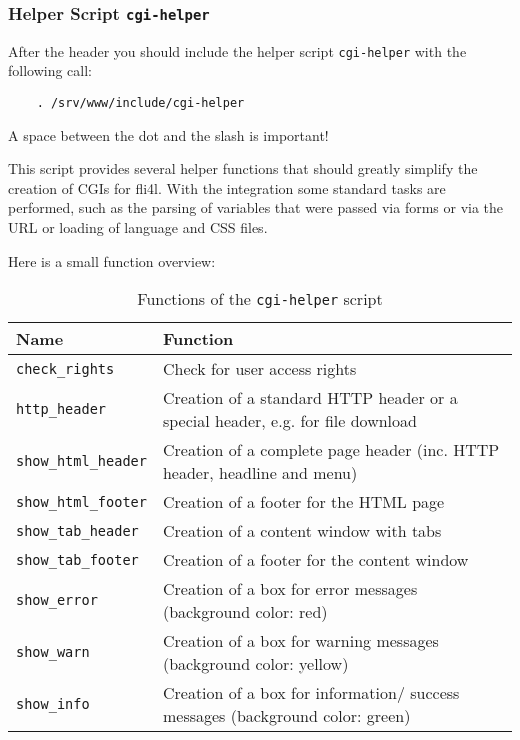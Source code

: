 \subsubsection{Helper Script \texttt{cgi-helper}}
After the header you should include the helper script \texttt{cgi-helper}
with the following call:

\begin{example}
\begin{verbatim}
    . /srv/www/include/cgi-helper
\end{verbatim}
\end{example}

A space between the dot and the slash is important!

This script provides several helper functions that should greatly simplify the
creation of CGIs for fli4l. With the integration some standard tasks are performed,
such as the parsing of variables that were passed via forms or via the URL or loading
of language and CSS files.

Here is a small function overview:

\begin{table}[htbp]
  \centering
  \caption{Functions of the \texttt{cgi-helper} script}
  \label{tab:dev:cgi-helper}
  \begin{small}
    \begin{tabular}{|l|p{}|}
      \hline
      Name                         & Function         \\
      \hline
      \texttt{check\_rights}      & Check for user access rights \\
      \texttt{http\_header}       & Creation of a standard HTTP header or a special header, e.g. for file download\\
      \texttt{show\_html\_header} & Creation of a complete page header (inc. HTTP header, headline and menu)\\
      \texttt{show\_html\_footer} & Creation of a footer for the HTML page\\
      \texttt{show\_tab\_header}  & Creation of a content window with tabs\\
      \texttt{show\_tab\_footer}  & Creation of a footer for the content window\\
      \texttt{show\_error}        & Creation of a box for error messages (background color: red)\\
      \texttt{show\_warn}         & Creation of a box for warning messages (background color: yellow)\\
      \texttt{show\_info}         & Creation of a box for information/ success messages (background color: green)\\
      \hline
    \end{tabular}
  \end{small}
\end{table}

